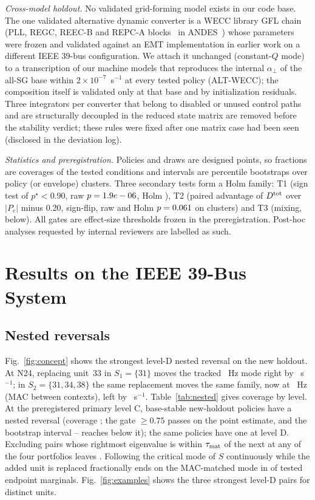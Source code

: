 \documentclass[journal]{IEEEtran}
\theoremstyle{remark}
\newcommand{\aperp}{\alpha_{\perp}}
\newcommand{\Dtot}{D^{\rm tot}}
\begin{document}
\emph{Cross-model holdout.} No validated grid-forming model exists in our code
base. The one validated alternative dynamic converter is a WECC library GFL chain
(PLL, REGC, REEC-B and REPC-A blocks~\cite{pourbeik2017generic} in
ANDES~\cite{cui2021andes}) whose parameters were frozen and validated against an
EMT implementation in earlier work on a different IEEE 39-bus configuration. We
attach it unchanged (constant-$Q$ mode) to a transcription of our machine models
that reproduces the internal $\aperp$ of the all-SG base within
$2\times10^{-7}$~s$^{-1}$ at every tested policy (ALT-WECC); the composition itself
is validated only at that base and by initialization residuals. Three integrators per
converter that belong to disabled or unused control paths and are structurally
decoupled in the reduced state matrix are removed before the stability verdict;
these rules were fixed after one matrix case had been seen (disclosed in the
deviation log).

\emph{Statistics and preregistration.} Policies and draws are designed points,
so fractions are coverages of the tested conditions and intervals are percentile
bootstraps over policy (or envelope) clusters. Three secondary tests form a Holm
family: T1 (sign test of $p^\star<0.90$, raw $p=1.9e-06$, Holm \tOnePholm), T2
(paired advantage of $\Dtot$ over $|P_e|$ minus 0.20, sign-flip, raw and Holm
$p=0.061$ on \nEligClusters{} clusters) and T3 (mixing, below). All gates are
effect-size thresholds frozen in the preregistration. Post-hoc analyses requested
by internal reviewers are labelled as such.

\section{Results on the IEEE 39-Bus System}\label{sec:results}

\subsection{Nested reversals}

Fig.~\ref{fig:concept} shows the strongest level-D nested reversal on the new
holdout. At N24, replacing unit~33 in $S_1=\{31\}$ moves the tracked \exHzOne~Hz mode
right by \exDoneAbs~s$^{-1}$; in $S_2=\{31,34,38\}$ the same replacement moves the same
family, now at \exHzTwo~Hz (MAC \exMac{} between contexts), left by \exDtwo~s$^{-1}$.
Table~\ref{tab:nested} gives coverage by level. At the preregistered primary level
C, \cntCNew{} base-stable new-holdout policies have a nested reversal (coverage
\covCNew; the gate $\ge0.75$ passes on the point estimate, and the bootstrap
interval \covCNewLo--\covCNewHi{} reaches below it); the same policies have one at
level D. Excluding pairs whose rightmost eigenvalue is within $\tau_{\rm mat}$ of
the next at any of the four portfolios leaves \gapCov. Following the critical mode
of $S$ continuously while the added unit is replaced fractionally ends on the
MAC-matched mode in \contMatch{} of \contN{} tested endpoint marginals.
Fig.~\ref{fig:examples} shows the three strongest level-D pairs for distinct units.
\end{document}
